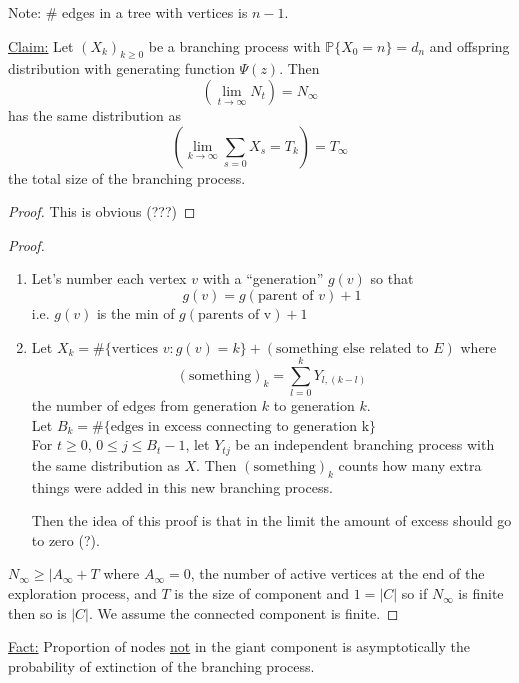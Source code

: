 \documentclass[12pt]{article}
\begin{document}
Note: \# edges in a tree with vertices is $n-1$.

\underline{Claim:} Let $(X_k)_{k\geq 0}$ be a branching process with $\mathbb P\{X_0 = n\} = d_n$ and offspring distribution with generating function $\Psi(z)$. Then
$$\left(\lim_{t\xrightarrow{}\infty}N_t\right) = N_{\infty}$$ has the same distribution as
$$\left(\lim_{k\xrightarrow{}\infty} \sum_{s=0}X_s = T_k\right) = T_{\infty}
$$ the total size of the branching process.

\begin{proof}
This is obvious (???)
\end{proof}
\begin{proof}
\begin{enumerate}
    \item Let's number each vertex $v$ with a ``generation'' $g(v)$ so that
    $$g(v) = g(\text{parent of }v)+1$$
    i.e. $g(v)$ is the min of $g(\text{parents of v})+1$
    \item Let $X_k = \#\{\text{vertices $v:g(v)=k$}\}+(\text{something else related to $E$})$
    where 
    $$(\text{something})_k = \sum_{l=0}^k Y_{l,(k-l)}
    $$
    the number of edges from generation $k$ to generation $k$.\\
    \noindent Let $B_k = \#\{\text{edges in excess connecting to generation k}\}$\\
    
    \noindent For $t \geq 0$, $0\leq j \leq B_t -1$, let $Y_{tj}$ be an independent branching process with the same distribution as $X$. Then $(\text{something})_k$ counts how many extra things were added in this new branching process.
    
    Then the idea of this proof is that in the limit the amount of excess should go to zero (?).
    
\end{enumerate}
$N_{\infty}\geq |A_{\infty} + T$ where $A_{\infty}=0$, the number of active vertices at the end of the exploration process, and $T$ is the size of component and $1=|C|$ so if $N_{\infty}$ is finite then so is $|C|$. We assume the connected component is finite.
\end{proof}

\underline{Fact:} Proportion of nodes \underline{not} in the giant component is asymptotically the probability of extinction of the branching process.
\end{document}
